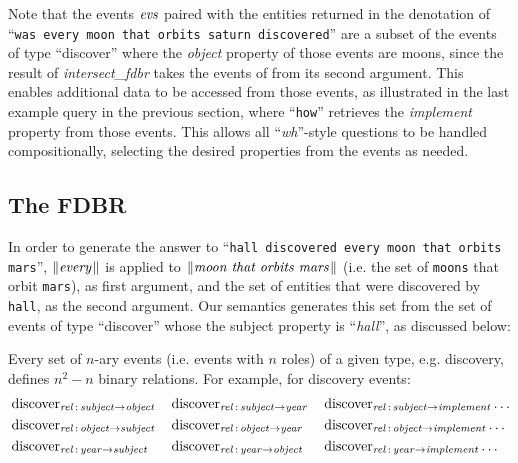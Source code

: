 \documentclass[../main.tex]{subfiles}
\begin{document}
\begin{refsection}
\noindent Note that the events $\operatorname{\mathit{evs}}$ paired with the entities returned in the denotation of ``\texttt{was every moon that orbits saturn discovered}'' are a subset of the events of type ``discover'' where the \textit{object} property of those events are moons, since the result of \textit{intersect\_fdbr} takes the events of from its second argument. This enables additional data to be accessed from those events, as illustrated in the last example query in the previous section, where ``\texttt{how}'' retrieves the \textit{implement} property from those events.  This allows all ``\textit{wh}''-style questions to be handled compositionally, selecting the desired properties from the events as needed.

\subsection{The FDBR}
\label{webist2019journal:fdbr}

In order to generate the  answer to ``\texttt{hall discovered every moon that orbits mars}'', $\lVert\textit{every\hspace{0.1em}}\rVert$ is applied to $\lVert\textit{moon that orbits mars\hspace{0.1em}}\rVert$ (i.e. the set of \texttt{moons} that orbit \texttt{mars}), as first argument, and the set of entities  that were discovered by \texttt{hall}, as the second argument.
Our semantics generates this set from the set of events of type ``discover'' whose the subject property is ``\textit{hall}'', as discussed below:

Every set of $n$-ary events (i.e. events with $n$ roles) of a given type, e.g. discovery, defines $n^2 - n$ binary relations. For example, for discovery events:
\begin{alignat*}{3}
	&\operatorname{discover}_{\operatorname{\mathit{rel}}\,:\,\operatorname{\mathit{subject}} \rightarrow \operatorname{\mathit{object}}} &&\operatorname{discover}_{\operatorname{\mathit{rel}}\,:\,\operatorname{\mathit{subject}} \rightarrow \operatorname{\mathit{year}}} &&\operatorname{discover}_{\operatorname{\mathit{rel}}\,:\,\operatorname{\mathit{subject}} \rightarrow \operatorname{\mathit{implement}}} \dots \\
	&\operatorname{discover}_{\operatorname{\mathit{rel}}\,:\,\operatorname{\mathit{object}} \rightarrow \operatorname{\mathit{subject}}} &&\operatorname{discover}_{\operatorname{\mathit{rel}}\,:\,\operatorname{\mathit{object}} \rightarrow \operatorname{\mathit{year}}} &&\operatorname{discover}_{\operatorname{\mathit{rel}}\,:\,\operatorname{\mathit{object}} \rightarrow \operatorname{\mathit{implement}}} \dots \\
	&\operatorname{discover}_{\operatorname{\mathit{rel}}\,:\,\operatorname{\mathit{year}} \rightarrow \operatorname{\mathit{subject}}} &&\operatorname{discover}_{\operatorname{\mathit{rel}}\,:\,\operatorname{\mathit{year}} \rightarrow \operatorname{\mathit{object}}} &&\operatorname{discover}_{\operatorname{\mathit{rel}}\,:\,\operatorname{\mathit{year}} \rightarrow \operatorname{\mathit{implement}}} \dots
\end{alignat*}


\end{refsection}
\end{document}
